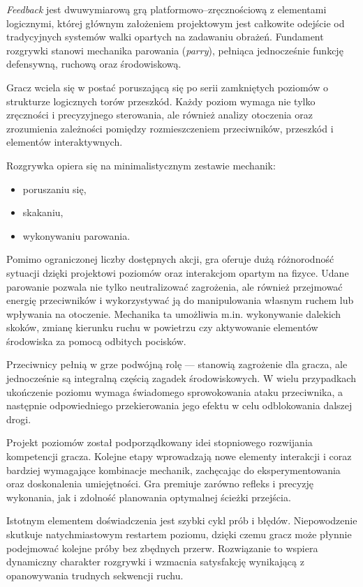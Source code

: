 \documentclass[11pt,a4paper]{article}
\begin{document}
\textit{Feedback} jest dwuwymiarową grą platformowo--zręcznościową z elementami logicznymi, której głównym założeniem projektowym jest całkowite odejście od tradycyjnych systemów walki opartych na zadawaniu obrażeń. Fundament rozgrywki stanowi mechanika parowania (\textit{parry}), pełniąca jednocześnie funkcję defensywną, ruchową oraz środowiskową.

Gracz wciela się w postać poruszającą się po serii zamkniętych poziomów o strukturze logicznych torów przeszkód. Każdy poziom wymaga nie tylko zręczności i precyzyjnego sterowania, ale również analizy otoczenia oraz zrozumienia zależności pomiędzy rozmieszczeniem przeciwników, przeszkód i elementów interaktywnych.

Rozgrywka opiera się na minimalistycznym zestawie mechanik:
\begin{itemize}[noitemsep]
    \item poruszaniu się,
    \item skakaniu,
    \item wykonywaniu parowania.
\end{itemize}

Pomimo ograniczonej liczby dostępnych akcji, gra oferuje dużą różnorodność sytuacji dzięki projektowi poziomów oraz interakcjom opartym na fizyce. Udane parowanie pozwala nie tylko neutralizować zagrożenia, ale również przejmować energię przeciwników i wykorzystywać ją do manipulowania własnym ruchem lub wpływania na otoczenie. Mechanika ta umożliwia m.in. wykonywanie dalekich skoków, zmianę kierunku ruchu w powietrzu czy aktywowanie elementów środowiska za pomocą odbitych pocisków.

Przeciwnicy pełnią w grze podwójną rolę — stanowią zagrożenie dla gracza, ale jednocześnie są integralną częścią zagadek środowiskowych. W wielu przypadkach ukończenie poziomu wymaga świadomego sprowokowania ataku przeciwnika, a następnie odpowiedniego przekierowania jego efektu w celu odblokowania dalszej drogi.

Projekt poziomów został podporządkowany idei stopniowego rozwijania kompetencji gracza. Kolejne etapy wprowadzają nowe elementy interakcji i coraz bardziej wymagające kombinacje mechanik, zachęcając do eksperymentowania oraz doskonalenia umiejętności. Gra premiuje zarówno refleks i precyzję wykonania, jak i zdolność planowania optymalnej ścieżki przejścia.

Istotnym elementem doświadczenia jest szybki cykl prób i błędów. Niepowodzenie skutkuje natychmiastowym restartem poziomu, dzięki czemu gracz może płynnie podejmować kolejne próby bez zbędnych przerw. Rozwiązanie to wspiera dynamiczny charakter rozgrywki i wzmacnia satysfakcję wynikającą z opanowywania trudnych sekwencji ruchu.
\end{document}
